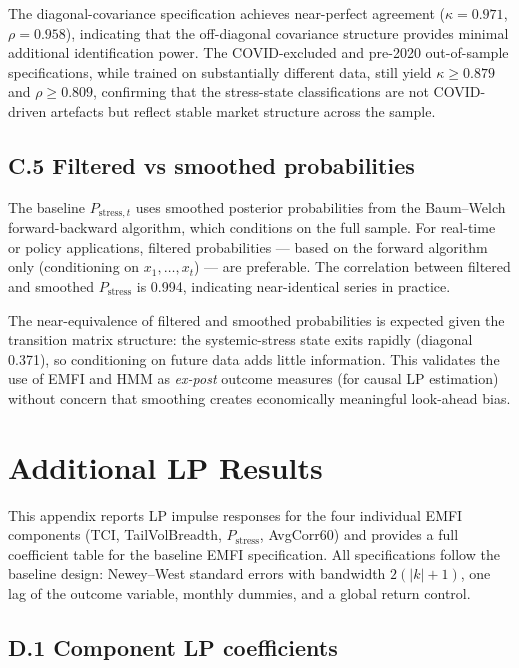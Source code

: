 \documentclass[11pt]{article}
\begin{document}
The diagonal-covariance specification achieves near-perfect agreement ($\kappa = 0.971$, $\rho = 0.958$), indicating that the off-diagonal covariance structure provides minimal additional identification power. The COVID-excluded and pre-2020 out-of-sample specifications, while trained on substantially different data, still yield $\kappa \geq 0.879$ and $\rho \geq 0.809$, confirming that the stress-state classifications are not COVID-driven artefacts but reflect stable market structure across the sample.

\subsection*{C.5 Filtered vs smoothed probabilities}

The baseline $P_{\text{stress},t}$ uses smoothed posterior probabilities from the Baum--Welch forward-backward algorithm, which conditions on the full sample. For real-time or policy applications, filtered probabilities --- based on the forward algorithm only (conditioning on $x_1,\ldots,x_t$) --- are preferable. The correlation between filtered and smoothed $P_{\text{stress}}$ is 0.994, indicating near-identical series in practice.

The near-equivalence of filtered and smoothed probabilities is expected given the transition matrix structure: the systemic-stress state exits rapidly (diagonal 0.371), so conditioning on future data adds little information. This validates the use of EMFI and HMM as \emph{ex-post} outcome measures (for causal LP estimation) without concern that smoothing creates economically meaningful look-ahead bias.

\section{Additional LP Results}
\label{app:lp}

This appendix reports LP impulse responses for the four individual EMFI components (TCI, TailVolBreadth, $P_{\text{stress}}$, AvgCorr60) and provides a full coefficient table for the baseline EMFI specification. All specifications follow the baseline design: Newey--West standard errors with bandwidth $2(|k|+1)$, one lag of the outcome variable, monthly dummies, and a global return control.

\subsection*{D.1 Component LP coefficients}
\end{document}

